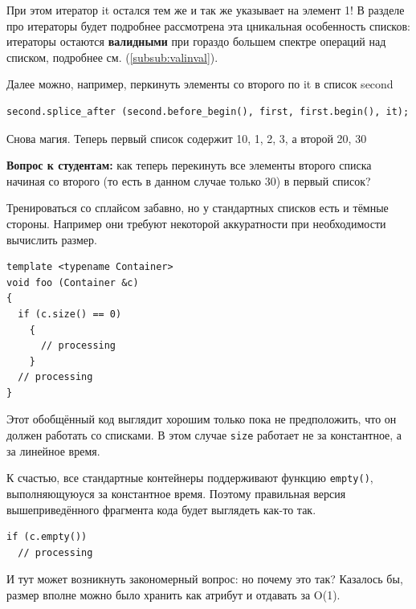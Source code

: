 \documentclass[a4paper,12pt,oneside]{book}
\newif\ifanswers
\begin{document}
При этом итератор it остался тем же и так же указывает на элемент 1! В разделе про итераторы будет подробнее рассмотрена эта цникальная особенность списков: итераторы остаются \textbf{валидными} при гораздо большем спектре операций над списком, подробнее см. (\ref{subsub:valinval}).

Далее можно, например, перкинуть элементы со второго по it в список second

\begin{lstlisting}
second.splice_after (second.before_begin(), first, first.begin(), it);
\end{lstlisting}

Снова магия. Теперь первый список содержит 10, 1, 2, 3, а второй 20, 30

\textbf{Вопрос к студентам:} как теперь перекинуть все элементы второго списка начиная со второго (то есть в данном случае только 30) в первый список?

\ifanswers
С тем, что уже известно, это не так уж и сложно.

\begin{lstlisting}
first.splice_after (first.before_begin(), second, second.begin());
\end{lstlisting}
\fi

Тренироваться со сплайсом забавно, но у стандартных списков есть и тёмные стороны. Например они требуют некоторой аккуратности при необходимости вычислить размер.

\begin{lstlisting}
template <typename Container> 
void foo (Container &c) 
{
  if (c.size() == 0)
    {
      // processing
    }
  // processing
}
\end{lstlisting}

Этот обобщённый код выглядит хорошим только пока не предположить, что он должен работать со списками. В этом случае \lstinline!size! работает не за константное, а за линейное время.

К счастью, все стандартные контейнеры поддерживают функцию \lstinline!empty()!, выполняющуюуся за константное время. Поэтому правильная версия вышеприведённого фрагмента кода будет выглядеть как-то так.

\begin{lstlisting}
if (c.empty())
  // processing
\end{lstlisting}

И тут может возникнуть закономерный вопрос: но почему это так? Казалось бы, размер вполне можно было хранить как атрибут и отдавать за O(1).
\end{document}
